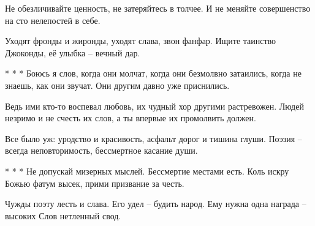 Не обезличивайте ценность,
не затеряйтесь в толчее.
И не меняйте совершенство
на сто нелепостей в себе.

Уходят фронды и жиронды,
уходят слава, звон фанфар.
Ищите таинство Джоконды,
её улыбка – вечный дар.

* * *
Боюсь я слов, когда они молчат,
когда они безмолвно затаились,
когда не знаешь, как они звучат.
Они другим давно уже приснились.

Ведь ими кто-то воспевал любовь,
их чудный хор другими растревожен.
Людей незримо и не счесть их слов,
а ты впервые их промолвить должен.

Все было уж: уродство и красивость,
асфальт дорог и тишина глуши.
Поэзия – всегда неповторимость,
бессмертное касание души.

* * * 
Не допускай мизерных мыслей.
Бессмертие местами есть.
Коль искру Божью фатум высек,
прими призвание за честь.

Чужды поэту лесть и слава.
Его удел – будить народ.
Ему нужна одна награда –
высоких Слов нетленный свод. 
